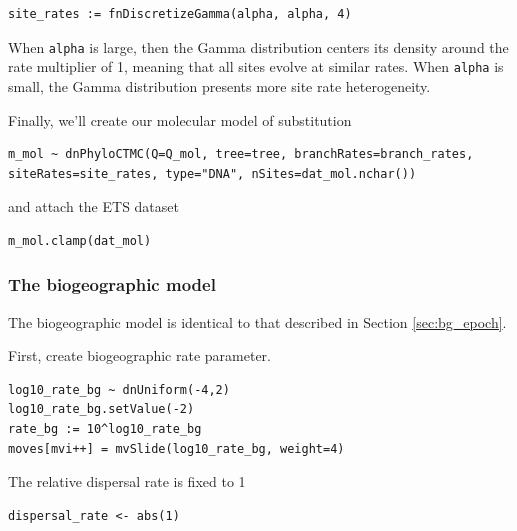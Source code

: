 \begin{snugshade}
\begin{lstlisting}
site_rates := fnDiscretizeGamma(alpha, alpha, 4)
\end{lstlisting}
\end{snugshade}

When {\tt alpha} is large, then the Gamma distribution centers its density around the rate multiplier of 1, meaning that all sites evolve at similar rates.
When {\tt alpha} is small, the Gamma distribution presents more site rate heterogeneity.

Finally, we'll create our molecular model of substitution

\begin{snugshade}
\begin{lstlisting}
m_mol ~ dnPhyloCTMC(Q=Q_mol, tree=tree, branchRates=branch_rates, siteRates=site_rates, type="DNA", nSites=dat_mol.nchar())
\end{lstlisting}
\end{snugshade}

and attach the ETS dataset

\begin{snugshade}
\begin{lstlisting}
m_mol.clamp(dat_mol)
\end{lstlisting}
\end{snugshade}


\subsubsection{The biogeographic model}

The biogeographic model is identical to that described in Section \ref{sec:bg_epoch}.

First, create biogeographic rate parameter.

\begin{snugshade}
\begin{lstlisting}
log10_rate_bg ~ dnUniform(-4,2)
log10_rate_bg.setValue(-2)
rate_bg := 10^log10_rate_bg
moves[mvi++] = mvSlide(log10_rate_bg, weight=4)
\end{lstlisting}
\end{snugshade}


The relative dispersal rate is fixed to 1
\begin{snugshade}
\begin{lstlisting}
dispersal_rate <- abs(1)
\end{lstlisting}
\end{snugshade}


